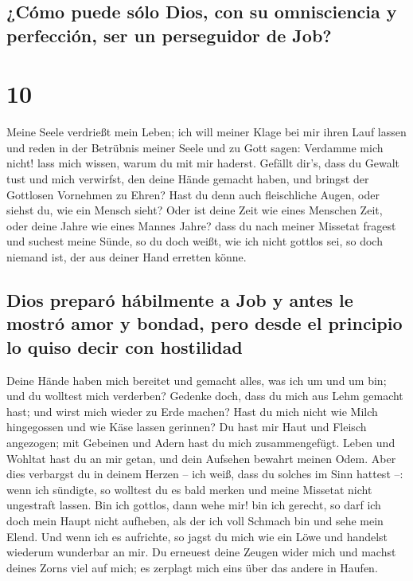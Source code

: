\hypertarget{cuxf3mo-puede-suxf3lo-dios-con-su-omnisciencia-y-perfecciuxf3n-ser-un-perseguidor-de-job}{%
\subsection{¿Cómo puede sólo Dios, con su omnisciencia y perfección, ser
un perseguidor de
Job?}\label{cuxf3mo-puede-suxf3lo-dios-con-su-omnisciencia-y-perfecciuxf3n-ser-un-perseguidor-de-job}}

\hypertarget{section-9}{%
\section{10}\label{section-9}}

 Meine Seele verdrießt mein Leben; ich will meiner Klage
bei mir ihren Lauf lassen und reden in der Betrübnis meiner Seele
 und zu Gott sagen: Verdamme mich nicht! lass mich wissen,
warum du mit mir haderst.  Gefällt dir's, dass du Gewalt
tust und mich verwirfst, den deine Hände gemacht haben, und bringst der
Gottlosen Vornehmen zu Ehren?  Hast du denn auch
fleischliche Augen, oder siehst du, wie ein Mensch sieht? 
Oder ist deine Zeit wie eines Menschen Zeit, oder deine Jahre wie eines
Mannes Jahre?  dass du nach meiner Missetat fragest und
suchest meine Sünde,  so du doch weißt, wie ich nicht
gottlos sei, so doch niemand ist, der aus deiner Hand erretten könne.

\hypertarget{dios-preparuxf3-huxe1bilmente-a-job-y-antes-le-mostruxf3-amor-y-bondad-pero-desde-el-principio-lo-quiso-decir-con-hostilidad}{%
\subsection{Dios preparó hábilmente a Job y antes le mostró amor y
bondad, pero desde el principio lo quiso decir con
hostilidad}\label{dios-preparuxf3-huxe1bilmente-a-job-y-antes-le-mostruxf3-amor-y-bondad-pero-desde-el-principio-lo-quiso-decir-con-hostilidad}}

 Deine Hände haben mich bereitet und gemacht alles, was
ich um und um bin; und du wolltest mich verderben? 
Gedenke doch, dass du mich aus Lehm gemacht hast; und wirst mich wieder
zu Erde machen?  Hast du mich nicht wie Milch hingegossen
und wie Käse lassen gerinnen?  Du hast mir Haut und
Fleisch angezogen; mit Gebeinen und Adern hast du mich zusammengefügt.
 Leben und Wohltat hast du an mir getan, und dein
Aufsehen bewahrt meinen Odem.  Aber dies verbargst du in
deinem Herzen -- ich weiß, dass du solches im Sinn hattest --:
 wenn ich sündigte, so wolltest du es bald merken und
meine Missetat nicht ungestraft lassen.  Bin ich gottlos,
dann wehe mir! bin ich gerecht, so darf ich doch mein Haupt nicht
aufheben, als der ich voll Schmach bin und sehe mein Elend.
 Und wenn ich es aufrichte, so jagst du mich wie ein Löwe
und handelst wiederum wunderbar an mir.  Du erneuest
deine Zeugen wider mich und machst deines Zorns viel auf mich; es
zerplagt mich eins über das andere in Haufen.

